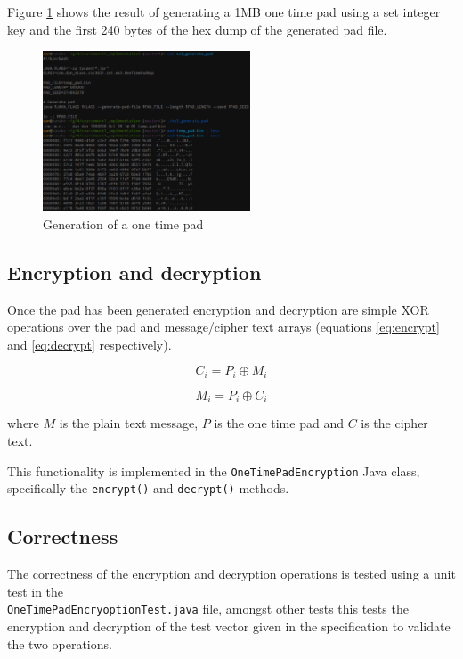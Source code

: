 \documentclass[a4paper]{article}
\begin{document}
Figure \ref{fig:generate_pad} shows the result of generating a 1MB one time pad
using a set integer key and the first 240 bytes of the hex dump of the generated
pad file.

\begin{figure}[h!]
  \centering
  \includegraphics[width=0.55\textwidth]{graphics/ex3_pad_generation.eps}
  \caption{Generation of a one time pad}
  \label{fig:generate_pad}
\end{figure}

\subsection{Encryption and decryption}

Once the pad has been generated encryption and decryption are simple XOR
operations over the pad and message/cipher text arrays (equations
\ref{eq:encrypt} and \ref{eq:decrypt} respectively).

\begin{equation}
  C_{i} = P_{i} \oplus M_{i}
  \label{eq:encrypt}
\end{equation}
\FloatBarrier

\begin{equation}
  M_{i} = P_{i} \oplus C_{i}
  \label{eq:decrypt}
\end{equation}
\FloatBarrier

where $M$ is the plain text message, $P$ is the one time pad and $C$ is the
cipher text.

This functionality is implemented in the \texttt{OneTimePadEncryption} Java
class, specifically the \texttt{encrypt()} and \texttt{decrypt()} methods.

\subsection{Correctness}

The correctness of the encryption and decryption operations is tested using a
unit test in the \\ \texttt{OneTimePadEncryoptionTest.java} file, amongst other
tests this tests the encryption and decryption of the test vector given in the
specification to validate the two operations.
\end{document}
